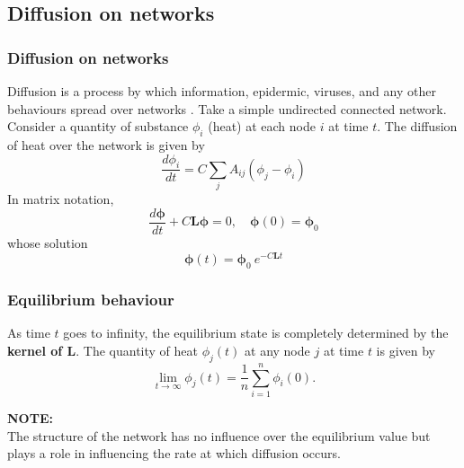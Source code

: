 \documentclass[10pt]{beamer}
\begin{document}
\subsection{Diffusion on networks}
\begin{frame}
	\frametitle{Diffusion on networks}
	
	Diffusion is a process by which information, epidermic, viruses, and any other behaviours spread over networks \cite{newman2010networks}.
	Take a simple undirected connected network. Consider a quantity of substance $\phi_i$ (heat) at each node $i$ at time $t$. The diffusion of heat over the network is given by\\
	\begin{equation}
	\frac{d\phi_i}{dt} = C \sum_j A_{ij}(\phi_j - \phi_i)
	\end{equation} 
	In matrix notation,
	\begin{equation}
	\frac{d\boldsymbol{\phi}}{dt} + C\mathbf{L}\boldsymbol{\phi} = 0, \quad \boldsymbol{\phi}(0) = \boldsymbol{\phi}_0 
	\end{equation}
	whose solution
	\begin{equation}
	\boldsymbol{\phi}(t) = \boldsymbol{\phi}_0~e^{-C\mathbf{L}t}
	\end{equation}  	
\end{frame}

\begin{frame}
	\frametitle{Equilibrium behaviour}
	As time $t$ goes to infinity, the equilibrium state is completely determined by the \textbf{kernel of $\mathbf{L}$}. 
	The quantity of heat $\phi_j(t)$ at any node $j$ at time $t$ is given by
	\begin{equation*}
	\lim_{t \to \infty}\phi_j(t) = \frac{1}{n} \sum_{i = 1}^n \phi_i(0). 
	\end{equation*}
	
	\vspace{1cm}
	\textbf{NOTE:} \\
	The structure of the network has no influence over the equilibrium value but plays a role in influencing the rate at which diffusion occurs.
\end{frame}
\end{document}
